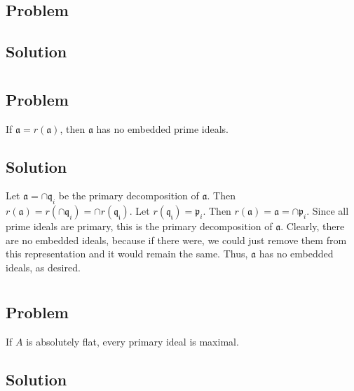 \documentclass[book,12pt,oneside,openany]{memoir}
\begin{document}
\subsection{Problem}

\subsection{Solution}

\section{}
\subsection{Problem}
If $\mathfrak{a} = r(\mathfrak{a})$, then $\mathfrak{a}$ has no embedded prime ideals.

\subsection{Solution}
Let $\mathfrak{a} = \cap \mathfrak{q}_i$ be the primary decomposition of $\mathfrak{a}$. Then $r(\mathfrak{a}) = r(\cap \mathfrak{q}_i) = \cap r(\mathfrak{q_i})$. Let $r(\mathfrak{q_i}) = \mathfrak{p}_i$. Then $r(\mathfrak{a}) = \mathfrak{a} = \cap \mathfrak{p}_i$. Since all prime ideals are primary, this is the primary decomposition of $\mathfrak{a}$. Clearly, there are no embedded ideals, because if there were, we could just remove them from this representation and it would remain the same. Thus, $\mathfrak{a}$ has no embedded ideals, as desired.

\section{}
\subsection{Problem}
If $A$ is absolutely flat, every primary ideal is maximal.

\subsection{Solution}
 
\end{document}
